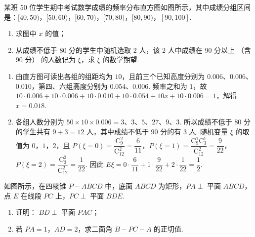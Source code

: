 \begin{problem}
某班 50 位学生期中考试数学成绩的频率分布直方图如图所示，其中成绩分组区间是：\([40,50)\)，\([50,60)\)，\([60,70)\)，\([70,80)\)，\([80,90)\)，\([90,100]\).

\begin{enumerate}
\item 求图中 \(x\) 的值；
\item 从成绩不低于 80 分的学生中随机选取 2 人，该 2 人中成绩在 90 分以上 （含 90 分） 的人数记为 \(\xi\)，求 \(\xi\) 的数学期望.
\end{enumerate}

\end{problem}

\begin{solution}
\begin{enumerate}
\item 由直方图可读出各组的组距均为 \(10\)，且前三个已知高度分别为 \(0.006\)、\(0.006\)、\(0.010\)，第四、六组高度分别为 \(0.054\)、\(0.006\). 频率之和为 \(1\)，故
\(10\cdot0.006+10\cdot0.006+10\cdot0.010+10\cdot0.054+10x+10\cdot0.006=1\)，解得 \(x=0.018\).
\item 各组人数分别为 \(50\times10\times0.006=3\)、\(3\)、\(5\)、\(27\)、\(9\)、\(3\). 所以成绩不低于 \(80\) 分的学生共有 \(9+3=12\) 人，其中成绩不低于 \(90\) 分的有 \(3\) 人. 随机变量 \(\xi\) 的取值为 \(0\)，\(1\)，\(2\)，且
\(P(\xi=0)=\dfrac{\mathrm C_9^2}{\mathrm C_{12}^2}=\dfrac{6}{11}\)，\(P(\xi=1)=\dfrac{\mathrm C_9^1\mathrm C_3^1}{\mathrm C_{12}^2}=\dfrac{9}{22}\)，\(P(\xi=2)=\dfrac{\mathrm C_3^2}{\mathrm C_{12}^2}=\dfrac{1}{22}\). 因此
\(E\xi=0\cdot\dfrac{6}{11}+1\cdot\dfrac{9}{22}+2\cdot\dfrac{1}{22}=\dfrac{1}{2}\).
\end{enumerate}
\end{solution}

\begin{problem}
如图所示，在四棱锥 \(P - ABCD\) 中，底面 \(ABCD\) 为矩形，\(PA \perp\) 平面 \(ABCD\)，点 \(E\) 在线段 \(PC\) 上，\(PC \perp\) 平面 \(BDE\).
\begin{enumerate}
\item 证明： \(BD \perp\) 平面 \(PAC\)；
\item 若 \(PA = 1\)，\(AD = 2\)，求二面角 \(B - PC - A\) 的正切值.
\end{enumerate}

\end{problem}

